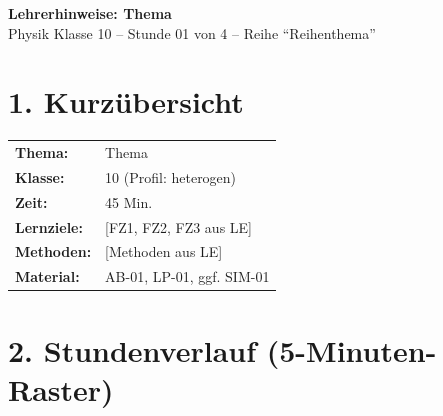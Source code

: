 \documentclass[11pt, a4paper]{article}
\newcommand{\fach}{Physik}
\newcommand{\thema}{Thema}
\newcommand{\klasse}{10}
\newcommand{\stunde}{01}
\newcommand{\stundenanzahl}{4}              %
\newcommand{\reihe}{Reihenthema}
\newcommand{\dauer}{45 Min.}
\begin{document}

\begin{center}
{\Large\textbf{\textcolor{fachfarbe}{Lehrerhinweise: \thema}}}\\[0.3em]
{\normalsize \fach{} Klasse \klasse{} -- Stunde \stunde{} von \stundenanzahl{} -- Reihe ``\reihe''}
\end{center}

\vspace{1em}


\section*{1. Kurzübersicht}

\begin{infobox}
\begin{tabular}{ll}
\textbf{Thema:} & \thema{} \\
\textbf{Klasse:} & \klasse{} (Profil: heterogen) \\
\textbf{Zeit:} & \dauer \\
\textbf{Lernziele:} & [FZ1, FZ2, FZ3 aus LE] \\
\textbf{Methoden:} & [Methoden aus LE] \\
\textbf{Material:} & AB-\stunde, LP-\stunde, ggf. SIM-\stunde \\
\end{tabular}
\end{infobox}


\section*{2. Stundenverlauf (5-Minuten-Raster)}
\end{document}
